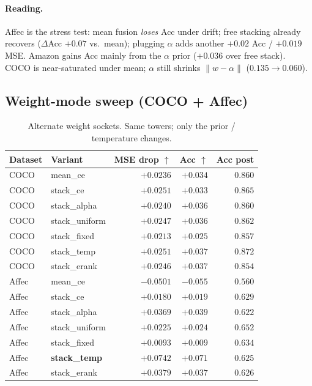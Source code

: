 \documentclass[11pt]{article}
\begin{document}
\paragraph{Reading.}
Affec is the stress test: mean fusion \emph{loses} Acc under drift;
free stacking already recovers ($\Delta$Acc ${+}0.07$ vs.\ mean);
plugging $\alpha$ adds another ${+}0.02$ Acc / ${+}0.019$ MSE.
Amazon gains Acc mainly from the $\alpha$ prior (${+}0.036$ over free stack).
COCO is near-saturated under mean; $\alpha$ still shrinks $\|w-\alpha\|$
($0.135\to 0.060$).

\subsection{Weight-mode sweep (COCO + Affec)}
\begin{table}[t]
\centering
\caption{Alternate weight sockets. Same towers; only the prior / temperature changes.}
\label{tab:naive-sweep}
\begin{tabular}{llrrr}
\toprule
Dataset & Variant & MSE drop $\uparrow$ & Acc $\uparrow$ & Acc post \\
\midrule
COCO  & mean\_ce       & $+0.0236$ & $+0.034$ & $0.860$ \\
COCO  & stack\_ce      & $+0.0251$ & $+0.033$ & $0.865$ \\
COCO  & stack\_alpha   & $+0.0240$ & $+0.036$ & $0.860$ \\
COCO  & stack\_uniform & $+0.0247$ & $+0.036$ & $0.862$ \\
COCO  & stack\_fixed   & $+0.0213$ & $+0.025$ & $0.857$ \\
COCO  & stack\_temp    & $+0.0251$ & $+0.037$ & $0.872$ \\
COCO  & stack\_erank   & $+0.0246$ & $+0.037$ & $0.854$ \\
\midrule
Affec & mean\_ce       & $-0.0501$ & $-0.055$ & $0.560$ \\
Affec & stack\_ce      & $+0.0180$ & $+0.019$ & $0.629$ \\
Affec & stack\_alpha   & $+0.0369$ & $+0.039$ & $0.622$ \\
Affec & stack\_uniform & $+0.0225$ & $+0.024$ & $0.652$ \\
Affec & stack\_fixed   & $+0.0093$ & $+0.009$ & $0.634$ \\
Affec & \textbf{stack\_temp} & $\mathbf{+0.0742}$ & $\mathbf{+0.071}$ & $0.625$ \\
Affec & stack\_erank   & $+0.0379$ & $+0.037$ & $0.626$ \\
\bottomrule
\end{tabular}
\end{table}
\end{document}
